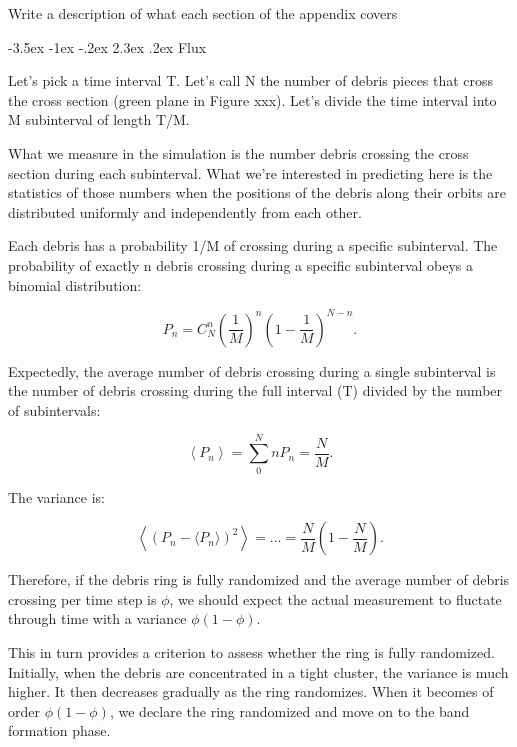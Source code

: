 \documentclass[a4paper, 12pt]{article}
\makeatletter
\renewcommand\section{\clearpage\newpage\@startsection {section}{1}{\z@}%
	{-3.5ex \@plus -1ex \@minus -.2ex}%
	{2.3ex \@plus.2ex}%
	{\normalfont\Large\bfseries}}
\makeatother
\begin{document}


\newpage
\begin{appendices}
Write a description of what each section of the appendix covers
	
\section{Flux}

Let's pick a time interval T. Let's call N the number of debris pieces that cross the cross section (green plane in Figure xxx). Let's divide the time interval into M subinterval of length T/M.

What we measure in the simulation is the number debris crossing the cross section during each subinterval. What we're interested in predicting here is the statistics of those numbers when the positions of the debris along their orbits are distributed uniformly and independently from each other.

Each debris has a probability 1/M of crossing during a specific subinterval. The probability of exactly n debris crossing during a specific subinterval obeys a binomial distribution:

$$P_n = C_N^n \left(\frac{1}{M}\right)^n\left(1-\frac{1}{M}\right)^{N-n} . $$

Expectedly, the average number of debris crossing during a single subinterval is the number of debris crossing during the full interval (T) divided by the number of subintervals:

$$\left\langle P_n \right\rangle = \sum_0^N n P_n = \frac{N}{M} .$$

The variance is:

$$\left\langle \left(P_n-\langle P_n\rangle \right)^2 \right\rangle = ... = \frac{N}{M}\left(1-\frac{N}{M}\right) . $$

Therefore, if the debris ring is fully randomized and the average number of debris crossing per time step is $\phi$, we should expect the actual measurement to fluctate through time with a variance $\phi(1-\phi)$.

This in turn provides a criterion to assess whether the ring is fully randomized. Initially, when the debris are concentrated in a tight cluster, the variance is much higher. It then decreases gradually as the ring randomizes. When it becomes of order $\phi(1-\phi)$, we declare the ring randomized and move on to the band formation phase.


\end{appendices}
\end{document}
